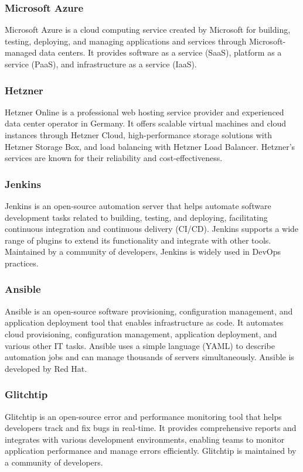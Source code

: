 \subsubsection{Microsoft Azure}
Microsoft Azure is a cloud computing service created by Microsoft for building, testing, deploying, and managing applications and services through Microsoft-managed data centers. It provides software as a service (SaaS), platform as a service (PaaS), and infrastructure as a service (IaaS).

\subsubsection{Hetzner}
Hetzner Online is a professional web hosting service provider and experienced data center operator in Germany. It offers scalable virtual machines and cloud instances through Hetzner Cloud, high-performance storage solutions with Hetzner Storage Box, and load balancing with Hetzner Load Balancer. Hetzner's services are known for their reliability and cost-effectiveness.

\subsubsection{Jenkins}
Jenkins is an open-source automation server that helps automate software development tasks related to building, testing, and deploying, facilitating continuous integration and continuous delivery (CI/CD). Jenkins supports a wide range of plugins to extend its functionality and integrate with other tools. Maintained by a community of developers, Jenkins is widely used in DevOps practices.

\subsubsection{Ansible}
Ansible is an open-source software provisioning, configuration management, and application deployment tool that enables infrastructure as code. It automates cloud provisioning, configuration management, application deployment, and various other IT tasks. Ansible uses a simple language (YAML) to describe automation jobs and can manage thousands of servers simultaneously. Ansible is developed by Red Hat.

\subsubsection{Glitchtip}
Glitchtip is an open-source error and performance monitoring tool that helps developers track and fix bugs in real-time. It provides comprehensive reports and integrates with various development environments, enabling teams to monitor application performance and manage errors efficiently. Glitchtip is maintained by a community of developers.

